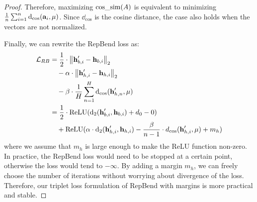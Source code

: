 \documentclass[11pt]{article}
\begin{document}
\begin{proof}
Therefore, maximizing $\text{cos\_sim}(A)$ is equivalent to minimizing $\frac{1}{n} \sum_{i=1}^{n} \text{d}_{\cos}(\mathbf{a}_i, \mu)$.
Since $\dd_{\cos}$ is the cosine distance, the case also holds when the vectors are not normalized.

Finally, we can rewrite the RepBend loss as:
\begin{align}
  \mathcal{L}_{RB} &= \frac{1}{2} \cdot \left\| \textbf{h}^\prime_{b,i} - \textbf{h}_{b,i} \right\|_2  \\
                   &\quad- \alpha \cdot \left\| \textbf{h}^\prime_{h,i} - \textbf{h}_{h,i} \right\|_2  \\
                            &\quad- \beta \cdot \frac{1}{H} \sum_{n=1}^{H} \text{d}_{\cos}(\textbf{h}^\prime_{h,n}, \mu)  \\
                            &= \frac{1}{2} \cdot \text{ReLU}(\text{d}_2(\textbf{h}^\prime_{b,i}, \textbf{h}_{b,i}) + d_0 - 0) \\
                            &\quad+ \text{ReLU}(\alpha \cdot \text{d}_2(\textbf{h}^\prime_{h,i}, \textbf{h}_{h,i}) - \frac{\beta}{n - 1} \cdot d_{\cos}(\textbf{h}^\prime_{h,i}, \mu) + m_h)
\end{align}
where we assume that $m_h$ is large enough to make the ReLU function non-zero.
In practice, the RepBend loss would need to be stopped at a certain point, otherwise the loss would tend to $-\infty$.
By adding a margin $m_h$, we can freely choose the number of iterations without worrying about divergence of the loss.
Therefore, our triplet loss formulation of RepBend with margins is more practical and stable.
\end{proof}
\end{document}
